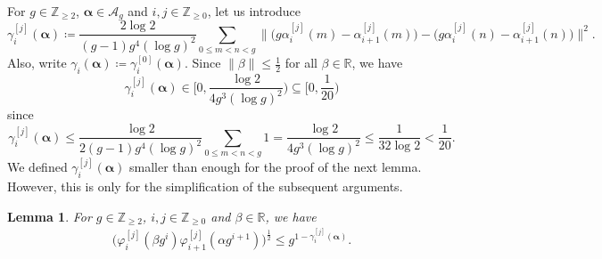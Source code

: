 \documentclass[hidelinks]{amsart}
\numberwithin{equation}{section}
\theoremstyle{plain}
\newtheorem{lemma}{Lemma}
\theoremstyle{definition}
\let\tmp\phi
\let\phi\varphi
\let\varphi\tmp
\let\tmp\epsilon
\let\epsilon\varepsilon
\let\varepsilon\tmp
\renewcommand{\subset}{\subseteq}
\begin{document}
For $g\in\mathbb{Z}_{\ge2}$, $\bm{\alpha}\in\mathscr{A}_{g}$ and $i,j\in\mathbb{Z}_{\ge0}$, let us introduce
\begin{equation}
\label{def:gamma}
\gamma_{i}^{[j]}(\bm{\alpha})
\coloneqq
\frac{2\log 2}{(g-1)g^{4}(\log g)^{2}}
\sum_{0\le m<n<g}
\bigl\|\bigl(g\alpha_{i}^{[j]}(m)-\alpha_{i+1}^{[j]}(m)\bigr)
-
\bigl(g\alpha_{i}^{[j]}(n)-\alpha_{i+1}^{[j]}(n)\bigr)\bigr\|^{2}.
\end{equation}
Also, write $\gamma_{i}(\bm{\alpha})\coloneqq\gamma_{i}^{[0]}(\bm{\alpha})$.
Since $\|\beta\|\le\frac{1}{2}$ for all $\beta\in\mathbb{R}$, we have
\begin{equation}
\label{gamma_bound}
\gamma_{i}^{[j]}(\bm{\alpha})
\in
\biggl[0,\frac{\log 2}{4g^{3}(\log g)^{2}}\biggr)
\subset
\biggl[0,\frac{1}{20}\biggr)
\end{equation}
since
\[
\gamma_{i}^{[j]}(\bm{\alpha})
\le
\frac{\log 2}{2(g-1)g^{4}(\log g)^{2}}
\sum_{0\le m<n<g}1
=
\frac{\log 2}{4g^{3}(\log g)^{2}}
\le
\frac{1}{32\log 2}
<
\frac{1}{20}.
\]
We defined $\gamma_{i}^{[j]}(\bm{\alpha})$ smaller than enough for the proof of the next lemma.
However, this is only for the simplification of the subsequent arguments.
\begin{lemma}
\label{lem:consecutive_phi}
For $g\in\mathbb{Z}_{\ge2}$, $i,j\in\mathbb{Z}_{\ge0}$ and $\beta\in\mathbb{R}$, we have
\begin{align}
\bigl(
\phi_{i}^{[j]}(\beta g^{i})
\phi_{i+1}^{[j]}(\alpha g^{i+1})
\bigr)^{\frac{1}{2}}
\le
g^{1-\gamma_{i}^{[j]}(\bm{\alpha})}.
\end{align}
\end{lemma}
\end{document}
